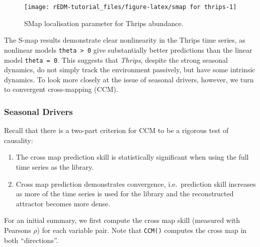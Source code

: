 \documentclass[]{article}
\providecommand{\tightlist}{%
  \setlength{\itemsep}{0pt}\setlength{\parskip}{0pt}}
\begin{document}
\begin{figure}[h]

{\centering \texttt{[image: rEDM-tutorial\_files/figure-latex/smap for thrips-1]} 

}

\caption{SMap localisation parameter for Thrips abundance.}\label{fig:smap for thrips}
\end{figure}

The S-map results demonstrate clear nonlinearity in the Thrips time
series, as nonlinear models \texttt{theta\ \textgreater{}\ 0} give
substantially better predictions than the linear model
\texttt{theta\ =\ 0}. This suggests that \emph{Thrips}, despite the
strong seasonal dynamics, do not simply track the environment passively,
but have some intrinsic dynamics. To look more closely at the issue of
seasonal drivers, however, we turn to convergent cross-mapping (CCM).

\hypertarget{seasonal-drivers}{%
\subsubsection{Seasonal Drivers}\label{seasonal-drivers}}

Recall that there is a two-part criterion for CCM to be a rigorous test
of causality:

\begin{enumerate}
\def\labelenumi{\arabic{enumi}.}
\tightlist
\item
  The cross map prediction skill is statistically significant when using
  the full time series as the library.
\item
  Cross map prediction demonstrates convergence, i.e.~prediction skill
  increases as more of the time series is used for the library and the
  reconstructed attractor becomes more dense.
\end{enumerate}

For an initial summary, we first compute the cross map skill (measured
with Pearsons \(\rho\)) for each variable pair. Note that \texttt{CCM()}
computes the cross map in both ``directions''.
\end{document}
